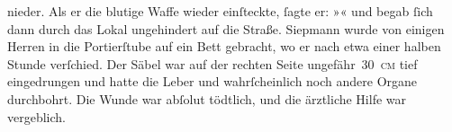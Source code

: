\begin{ledgroupsized}[t]{13cm}
               nieder. Als er die blutige Waffe wieder einſteckte, ſagte er: »« und begab ſich dann durch das Lokal ungehindert auf die
               Straße. Siepmann wurde von einigen Herren in
               die Portierſtube auf ein Bett gebracht, wo er nach etwa einer halben Stunde
               verſchied. Der Säbel war auf der rechten Seite ungefähr 30 \textsc{cm}
               tief eingedrungen und hatte die Leber und wahrſcheinlich noch andere Organe
               durchbohrt. Die Wunde war abſolut tödtlich, und die ärztliche Hilfe war
               vergeblich.\pend
           
         
         \endnumbering{}\end{ledgroupsized}  \newcommand{\dateiname}{L02787}\newcommand{\titel}{Paul Goldmann an Arthur Schnitzler, 17. 10. [1896]}\newcommand{\editorInnen}{Martin Anton Müller und Laura Untner}
      